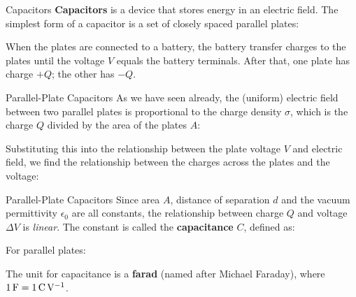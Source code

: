 \documentclass[12pt,aspectratio=169]{beamer}
\begin{document}
\begin{frame}{Capacitors}
  \textbf{Capacitors} is a device that stores energy in an electric field. The
  simplest form of a capacitor is a set of closely spaced parallel plates:
  \begin{center}
  \end{center}
  When the plates are connected to a battery, the battery transfer charges to
  the plates until the voltage $V$ equals the battery terminals. After that,
  one plate has charge $+Q$; the other has $-Q$.
\end{frame}



\begin{frame}{Parallel-Plate Capacitors}
  As we have seen already, the (uniform) electric field between two parallel
  plates is proportional to the charge density $\sigma$, which is the charge
  $Q$ divided by the area of the plates $A$:

  
  Substituting this into the relationship between the plate voltage $V$ and
  electric field, we find the relationship between the charges across the
  plates and the voltage:

\end{frame}



\begin{frame}{Parallel-Plate Capacitors}
  Since area $A$, distance of separation $d$ and the vacuum permittivity
  $\epsilon_0$ are all constants, the relationship between charge $Q$ and
  voltage $\Delta V$ is \emph{linear}. The constant is called the
  \textbf{capacitance} $C$, defined as:


  For parallel plates:


  The unit for capacitance is a \textbf{farad} (named after Michael Faraday),
  where $\SI1\farad=\SI1{\coulomb\per\volt}$.
\end{frame}
\end{document}
